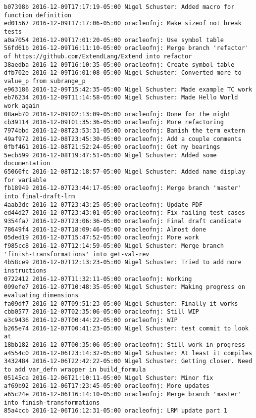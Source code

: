 \begin{lstlisting}
b07398b 2016-12-09T17:17:19-05:00 Nigel Schuster: Added macro for function definition
ed01567 2016-12-09T17:17:06-05:00 oracleofnj: Make sizeof not break tests
a0a7054 2016-12-09T17:01:20-05:00 oracleofnj: Use symbol table
56fd61b 2016-12-09T16:11:10-05:00 oracleofnj: Merge branch 'refactor' of https://github.com/ExtendLang/Extend into refactor
38aedba 2016-12-09T16:10:35-05:00 oracleofnj: Create symbol table
dfb702e 2016-12-09T16:01:08-05:00 Nigel Schuster: Converted more to value_p from subrange_p
e963186 2016-12-09T15:42:35-05:00 Nigel Schuster: Made example TC work
eb76234 2016-12-09T11:14:58-05:00 Nigel Schuster: Made Hello World work again
08aeb70 2016-12-09T02:13:09-05:00 oracleofnj: Done for the night
cb39114 2016-12-09T01:35:36-05:00 oracleofnj: More refactoring
7974bbd 2016-12-08T23:53:31-05:00 oracleofnj: Banish the term extern
49af972 2016-12-08T23:45:30-05:00 oracleofnj: Add a couple comments
0fbf461 2016-12-08T21:52:24-05:00 oracleofnj: Get my bearings
5ecb599 2016-12-08T19:47:51-05:00 Nigel Schuster: Added some documentation
65066fc 2016-12-08T12:18:57-05:00 Nigel Schuster: Added name display for variable
fb18949 2016-12-07T23:44:17-05:00 oracleofnj: Merge branch 'master' into final-draft-lrm
4aab3dc 2016-12-07T23:43:25-05:00 oracleofnj: Update PDF
ed44d27 2016-12-07T23:43:01-05:00 oracleofnj: Fix failing test cases
9354fa7 2016-12-07T23:06:36-05:00 oracleofnj: Final draft candidate
78649f4 2016-12-07T18:09:46-05:00 oracleofnj: Almost done
05ded19 2016-12-07T15:47:52-05:00 oracleofnj: More work
f985cc8 2016-12-07T12:14:59-05:00 Nigel Schuster: Merge branch 'finish-transformations' into get-val-rev
4b58ce9 2016-12-07T12:13:23-05:00 Nigel Schuster: Tried to add more instructions
0722412 2016-12-07T11:32:11-05:00 oracleofnj: Working
099efe7 2016-12-07T10:48:35-05:00 Nigel Schuster: Making progress on evaluating dimensions
fa09df7 2016-12-07T09:51:23-05:00 Nigel Schuster: Finally it works
cbb0577 2016-12-07T02:35:06-05:00 oracleofnj: Still WIP
e3c9436 2016-12-07T00:44:22-05:00 oracleofnj: WIP
b265e74 2016-12-07T00:41:23-05:00 Nigel Schuster: test commit to look at
18bb182 2016-12-07T00:35:06-05:00 oracleofnj: Still work in progress
a4554c0 2016-12-06T23:14:32-05:00 Nigel Schuster: At least it compiles
3432484 2016-12-06T22:42:22-05:00 Nigel Schuster: Getting closer. Need to add var_defn wrapper in build_formula
05145ca 2016-12-06T21:10:11-05:00 Nigel Schuster: Minor fix
af69b92 2016-12-06T17:23:45-05:00 oracleofnj: More updates
a65c24e 2016-12-06T16:14:10-05:00 oracleofnj: Merge branch 'master' into finish-transformations
85a4ccb 2016-12-06T16:12:31-05:00 oracleofnj: LRM update part 1

\end{lstlisting}

